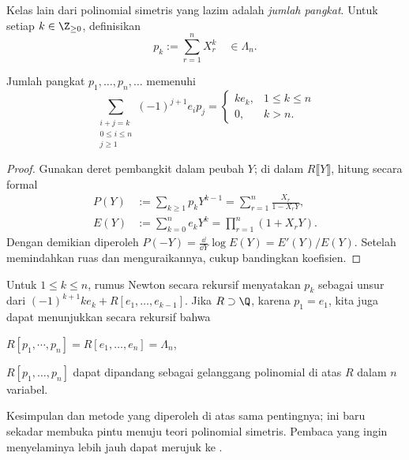 Kelas lain dari polinomial simetris yang lazim adalah \emph{jumlah pangkat}. Untuk setiap $k \in \Z_{\geq 0}$, definisikan 
\[ p_k := \sum_{r=1}^n X_r^k \quad \in \Lambda_n. \]

\begin{theorem} 
	Jumlah pangkat $p_1, \ldots, p_n, \ldots$ memenuhi
	\[ \sum_{\substack{i+j=k \\ 0 \leq i \leq n \\ j \geq 1}} (-1)^{j+1} e_i p_j =
	\begin{cases}
		k e_k, & 1 \leq k \leq n \\
		0, & k > n.
	\end{cases}\]
\end{theorem}
\begin{proof}
	Gunakan deret pembangkit dalam peubah $Y$; di dalam $R\llbracket Y \rrbracket$, hitung secara formal
	\begin{align*}
		P(Y) & := \sum_{k \geq 1} p_k Y^{k-1} = \sum_{r=1}^n \frac{X_r}{1 - X_r Y}, \\
		E(Y) & := \sum_{k=0}^n e_k Y^k = \prod_{r=1}^n (1 + X_r Y).
	\end{align*}
	Dengan demikian diperoleh $P(-Y) = \frac{\dd}{\dd Y} \log E(Y) = E'(Y)/E(Y)$. Setelah memindahkan ruas dan menguraikannya, cukup bandingkan koefisien.
\end{proof}
Untuk $1 \leq k \leq n$, rumus Newton secara rekursif menyatakan $p_k$ sebagai unsur dari $(-1)^{k+1} k e_k + R[e_1, \ldots, e_{k-1}]$. Jika $R \supset \Q$, karena $p_1 = e_1$, kita juga dapat menunjukkan secara rekursif bahwa
\begin{compactitem}
	\item $R[p_1, \cdots, p_n] = R[e_1, \ldots, e_n] = \Lambda_n$,
	\item $R[p_1, \ldots, p_n]$ dapat dipandang sebagai gelanggang polinomial di atas $R$ dalam $n$ variabel.
\end{compactitem}

Kesimpulan dan metode yang diperoleh di atas sama pentingnya; ini baru sekadar membuka pintu menuju teori polinomial simetris. Pembaca yang ingin menyelaminya lebih jauh dapat merujuk ke \cite{Mac95}.

